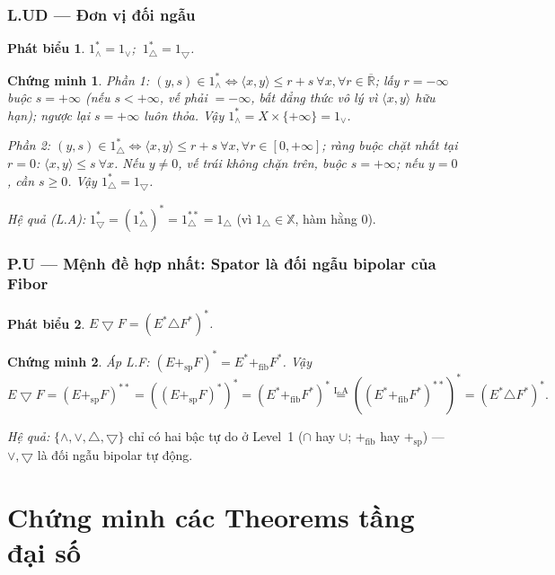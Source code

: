 \documentclass[11pt]{article}
\theoremstyle{plainlabel}
\newtheorem*{phatbieu}{Phát biểu}
\newtheorem*{chungminh}{Chứng minh}
\begin{document}
\subsubsection*{L.UD --- Đơn vị đối ngẫu}
\begin{phatbieu} $1_\wedge^*=1_\vee$; $\ 1_\triangle^*=1_{\bigtriangledown}$. \end{phatbieu}
\begin{chungminh}
Phần 1: $(y,s)\in1_\wedge^*\iff\langle x,y\rangle\le r+s\ \forall x,\forall r\in\overline{\mathbb R}$; lấy $r=-\infty$ buộc $s=+\infty$ (nếu $s<+\infty$, vế phải $=-\infty$, bất đẳng thức vô lý vì $\langle x,y\rangle$ hữu hạn); ngược lại $s=+\infty$ luôn thỏa. Vậy $1_\wedge^*=X\times\{+\infty\}=1_\vee$.

Phần 2: $(y,s)\in1_\triangle^*\iff\langle x,y\rangle\le r+s\ \forall x,\forall r\in[0,+\infty]$; ràng buộc chặt nhất tại $r=0$: $\langle x,y\rangle\le s\ \forall x$. Nếu $y\neq0$, vế trái không chặn trên, buộc $s=+\infty$; nếu $y=0$, cần $s\ge0$. Vậy $1_\triangle^*=1_{\bigtriangledown}$.
\end{chungminh}
\emph{Hệ quả (L.A):} $1_{\bigtriangledown}^*=(1_\triangle^*)^*=1_\triangle^{**}=1_\triangle$ (vì $1_\triangle\in\mathbb X$, hàm hằng $0$).

\subsubsection*{P.U --- Mệnh đề hợp nhất: Spator là đối ngẫu bipolar của Fibor}
\begin{phatbieu} $E\bigtriangledown F=(E^*\triangle F^*)^*$. \end{phatbieu}
\begin{chungminh}
Áp L.F: $(E+_{\mathrm{sp}}F)^*=E^*+_{\mathrm{fib}}F^*$. Vậy
\[
E\bigtriangledown F=(E+_{\mathrm{sp}}F)^{**}=((E+_{\mathrm{sp}}F)^*)^*=(E^*+_{\mathrm{fib}}F^*)^*\overset{\text{L.A}}{=}((E^*+_{\mathrm{fib}}F^*)^{**})^*=(E^*\triangle F^*)^*.
\]
\end{chungminh}
\emph{Hệ quả:} $\{\wedge,\vee,\triangle,\bigtriangledown\}$ chỉ có hai bậc tự do ở Level~1 ($\cap$ hay $\cup$; $+_{\mathrm{fib}}$ hay $+_{\mathrm{sp}}$) — $\vee,\bigtriangledown$ là đối ngẫu bipolar tự động.

\section{Chứng minh các Theorems tầng đại số}
\label{sec:theorems}
\end{document}
